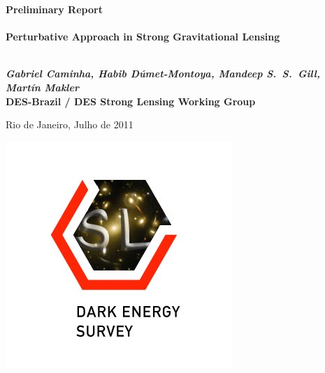 \begin{titlepage}

\begin{center}



\textbf{\Large Preliminary Report  }\\[3.5cm]

\HRule \\[0.6cm]
{ \large \bfseries Perturbative Approach in Strong Gravitational Lensing}\\[0.4cm]

\HRule \\[1.0cm]

\vspace{2.0cm}

{\Large \textbf{\textit{Gabriel Caminha, Habib D\'umet-Montoya, Mandeep S.~S.~Gill, Mart\'in Makler}}}\\
{\large \textbf{DES-Brazil / DES Strong Lensing Working Group}}\\[1.5cm]

\vfill

{\large Rio de Janeiro, Julho de 2011}

\end{center}

\begin{flushright}
    \includegraphics[scale=0.5]{graphics/SLSG-Logo.jpg}
\end{flushright}

\end{titlepage} 